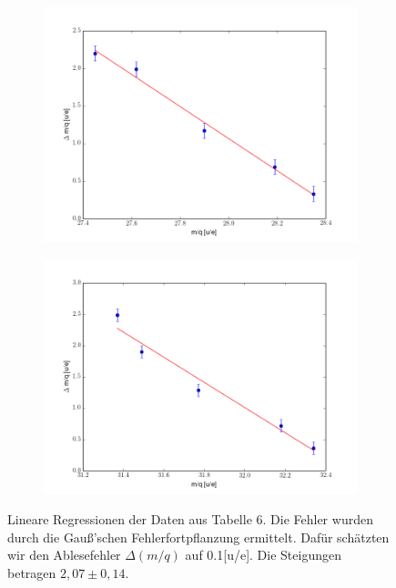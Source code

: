 \begin{figure}[h]
\centering
\begin{subfigure}{0.49\textwidth}
\includegraphics[width=\textwidth]{img/mq1}
\end{subfigure}
\begin{subfigure}{0.49\textwidth}
\includegraphics[width=\textwidth]{img/mq2}
\end{subfigure} 
\caption{Lineare Regressionen der Daten aus Tabelle 6. Die Fehler wurden durch die Gauß’schen Fehlerfortpflanzung ermittelt. Dafür schätzten wir den Ablesefehler $\Delta(m/q)$ auf 0.1[u/e]. Die Steigungen betragen $2,07\pm 0,14$.}
\end{figure}

